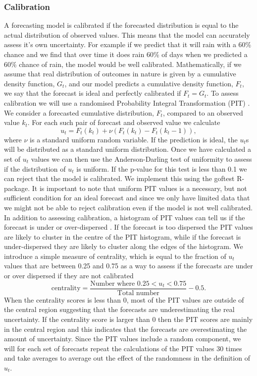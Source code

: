 \documentclass[12pt]{article}
\begin{document}
\subsubsection{Calibration}
A forecasting model is calibrated if the forecasted distribution is equal to the actual distribution of observed values. This means that the model can accurately assess it's own uncertainty. For example if we predict that it will rain with a 60\% chance and we find that over time it does rain 60\% of days when we predicted a 60\% chance of rain, the model would be well calibrated. Mathematically, if we assume that real distribution of outcomes in nature is given by a cumulative density function, $G_t$, and our model predicts a cumulative density function, $F_t$, we say that the forecast is ideal and perfectly calibrated if $F_t=G_t$. To assess calibration we will use a randomised Probability Integral Transformation (PIT) \cite{czadoPredictiveModelAssessment2009a}. We consider a forecasted cumulative distribution, $F_t$, compared to an observed value $k_t$. For each such pair of forecast and observed value we calculate
\[ u_t = F_t(k_t) + \nu (F_t(k_t) - F_t(k_t -1)),\]
where $\nu$ is a standard uniform random variable. If the prediction is ideal, the $u_t$s will be distributed as a standard uniform distribution. Once we have calculated a set of $u_t$ values we can then use the Anderson-Darling test of uniformity to assess if the distribution of $u_t$ is uniform. If the p-value for this test is less than 0.1 we can reject that the model is calibrated. We implement this using the goftest \cite{farawayGoftestClassicalGoodnessofFit2017} R-package. It is important to note that uniform PIT values is a necessary, but not sufficient condition for an ideal forecast and since we only have limited data that we might not be able to reject calibration even if the model is not well calibrated. In addition to assessing calibration, a histogram of PIT values can tell us if the forecast is under or over-dispersed \cite{czadoPredictiveModelAssessment2009a}. If the forecast is too dispersed the PIT values are likely to cluster in the centre of the PIT histogram, while if the forecast is under-dispersed they are likely to cluster along the edges of the histogram. We introduce a simple measure of centrality, which is equal to the fraction of $u_t$ values that are between 0.25 and 0.75 as a way to assess if the forecasts are under or over dispersed if they are not calibrated
\[\text{centrality} = \frac{\text{Number where }0.25 < u_t < 0.75}{\text{Total number}} - 0.5.\]
When the centrality scores is less than 0, most of the PIT values are outside of the central region suggesting that the forecasts are underestimating the real uncertainty.  If the centrality score is larger than 0 then the PIT scores are mainly in the central region and this indicates that the forecasts are overestimating the amount of uncertainty. Since the PIT values include a random component, we will for each set of forecasts repeat the calculations of the PIT values 30 times and take averages to average out the effect of the randomness in the definition of $u_t$.
\end{document}
